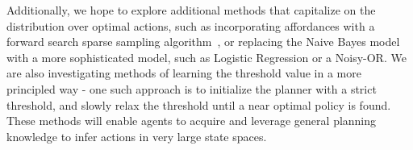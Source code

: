 \documentclass[letterpaper]{article}
\begin{document}
Additionally, we hope to explore additional methods that capitalize on
the distribution over optimal actions, such as incorporating
affordances with a forward search sparse sampling
algorithm~\cite{walsh2010integrating}, or replacing the Naive Bayes
model with a more sophisticated model, such as Logistic Regression or
a Noisy-OR.  We are also investigating methods of learning the
threshold value in a more principled way - one such approach is to
initialize the planner with a strict threshold, and slowly relax the
threshold until a near optimal policy is found.  These methods will
enable agents to acquire and leverage general planning knowledge to
infer actions in very large state spaces.

{\small


}
\end{document}
